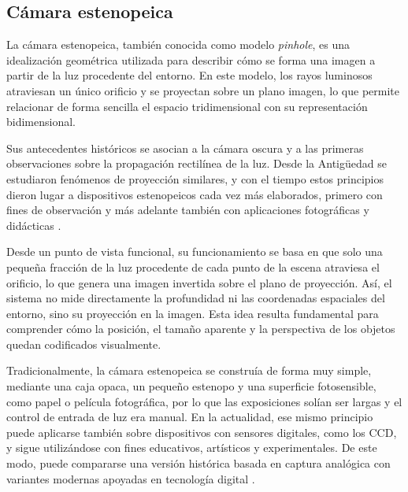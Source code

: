 \vspace{0.3cm}

\subsection{Cámara estenopeica}

La cámara estenopeica, también conocida como modelo \textit{pinhole}, es una idealización geométrica utilizada para describir cómo se forma una imagen a partir de la luz procedente del entorno. En este modelo, los rayos luminosos atraviesan un único orificio y se proyectan sobre un plano imagen, lo que permite relacionar de forma sencilla el espacio tridimensional con su representación bidimensional.

\vspace{0.3cm}

Sus antecedentes históricos se asocian a la cámara oscura y a las primeras observaciones sobre la propagación rectilínea de la luz. Desde la Antigüedad se estudiaron fenómenos de proyección similares, y con el tiempo estos principios dieron lugar a dispositivos estenopeicos cada vez más elaborados, primero con fines de observación y más adelante también con aplicaciones fotográficas y didácticas \cite{wikipediaCamaraEstenopeica}.

\vspace{0.3cm}

Desde un punto de vista funcional, su funcionamiento se basa en que solo una pequeña fracción de la luz procedente de cada punto de la escena atraviesa el orificio, lo que genera una imagen invertida sobre el plano de proyección. Así, el sistema no mide directamente la profundidad ni las coordenadas espaciales del entorno, sino su proyección en la imagen. Esta idea resulta fundamental para comprender cómo la posición, el tamaño aparente y la perspectiva de los objetos quedan codificados visualmente.

\vspace{0.3cm}

Tradicionalmente, la cámara estenopeica se construía de forma muy simple, mediante una caja opaca, un pequeño estenopo y una superficie fotosensible, como papel o película fotográfica, por lo que las exposiciones solían ser largas y el control de entrada de luz era manual. En la actualidad, ese mismo principio puede aplicarse también sobre dispositivos con sensores digitales, como los CCD, y sigue utilizándose con fines educativos, artísticos y experimentales. De este modo, puede compararse una versión histórica basada en captura analógica con variantes modernas apoyadas en tecnología digital \cite{wikipediaCamaraEstenopeica}.

